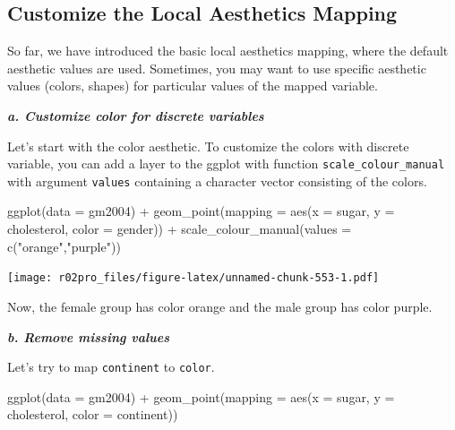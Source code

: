 \documentclass[
]{book}
\newenvironment{Shaded}{\begin{snugshade}}{\end{snugshade}}
\newcommand{\AttributeTok}[1]{\textcolor[rgb]{0.77,0.63,0.00}{#1}}
\newcommand{\FunctionTok}[1]{\textcolor[rgb]{0.00,0.00,0.00}{#1}}
\newcommand{\NormalTok}[1]{#1}
\newcommand{\SpecialCharTok}[1]{\textcolor[rgb]{0.00,0.00,0.00}{#1}}
\newcommand{\StringTok}[1]{\textcolor[rgb]{0.31,0.60,0.02}{#1}}
\begin{document}
\hypertarget{customize-the-local-aesthetics-mapping}{%
\subsection{Customize the Local Aesthetics Mapping}\label{customize-the-local-aesthetics-mapping}}

So far, we have introduced the basic local aesthetics mapping, where the default aesthetic values are used. Sometimes, you may want to use specific aesthetic values (colors, shapes) for particular values of the mapped variable.

\textbf{\emph{a. Customize color for discrete variables}}

Let's start with the color aesthetic. To customize the colors with discrete variable, you can add a layer to the ggplot with function \texttt{scale\_colour\_manual} with argument \texttt{values} containing a character vector consisting of the colors.

\begin{Shaded}
\begin{Highlighting}[]
\FunctionTok{ggplot}\NormalTok{(}\AttributeTok{data =}\NormalTok{ gm2004) }\SpecialCharTok{+} 
  \FunctionTok{geom\_point}\NormalTok{(}\AttributeTok{mapping =} \FunctionTok{aes}\NormalTok{(}\AttributeTok{x =}\NormalTok{ sugar, }
                           \AttributeTok{y =}\NormalTok{ cholesterol,}
                           \AttributeTok{color =}\NormalTok{ gender)) }\SpecialCharTok{+} 
  \FunctionTok{scale\_colour\_manual}\NormalTok{(}\AttributeTok{values =} \FunctionTok{c}\NormalTok{(}\StringTok{"orange"}\NormalTok{,}\StringTok{"purple"}\NormalTok{))}
\end{Highlighting}
\end{Shaded}

\texttt{[image: r02pro\_files/figure-latex/unnamed-chunk-553-1.pdf]}

Now, the female group has color orange and the male group has color purple.

\textbf{\emph{b. Remove missing values}}

Let's try to map \texttt{continent} to \texttt{color}.

\begin{Shaded}
\begin{Highlighting}[]
\FunctionTok{ggplot}\NormalTok{(}\AttributeTok{data =}\NormalTok{ gm2004) }\SpecialCharTok{+} 
  \FunctionTok{geom\_point}\NormalTok{(}\AttributeTok{mapping =} \FunctionTok{aes}\NormalTok{(}\AttributeTok{x =}\NormalTok{ sugar, }
                           \AttributeTok{y =}\NormalTok{ cholesterol,}
                           \AttributeTok{color =}\NormalTok{ continent))}
\end{Highlighting}
\end{Shaded}
\end{document}
